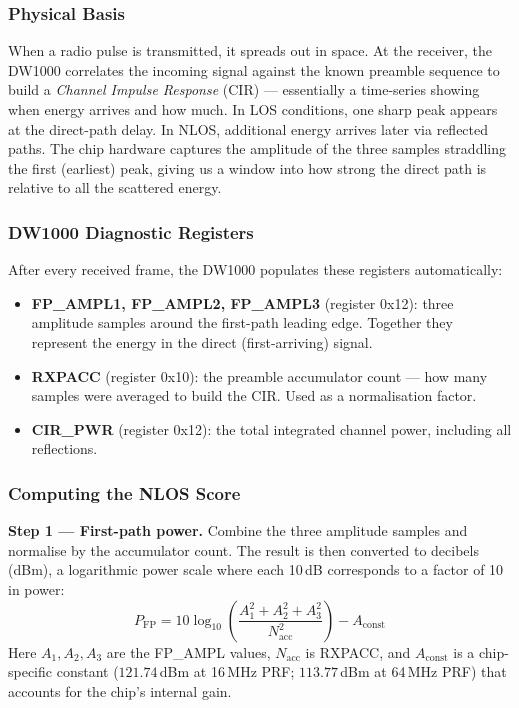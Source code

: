 \documentclass[11pt,a4paper]{article}
\begin{document}
\subsubsection{Physical Basis}

When a radio pulse is transmitted, it spreads out in space. At the receiver, the DW1000 correlates the incoming signal against the known preamble sequence to build a \emph{Channel Impulse Response} (CIR) --- essentially a time-series showing when energy arrives and how much. In LOS conditions, one sharp peak appears at the direct-path delay. In NLOS, additional energy arrives later via reflected paths. The chip hardware captures the amplitude of the three samples straddling the first (earliest) peak, giving us a window into how strong the direct path is relative to all the scattered energy.

\subsubsection{DW1000 Diagnostic Registers}

After every received frame, the DW1000 populates these registers automatically:

\begin{itemize}[leftmargin=2em]
  \item \textbf{FP\_AMPL1, FP\_AMPL2, FP\_AMPL3} (register 0x12): three amplitude samples around the first-path leading edge. Together they represent the energy in the direct (first-arriving) signal.
  \item \textbf{RXPACC} (register 0x10): the preamble accumulator count --- how many samples were averaged to build the CIR. Used as a normalisation factor.
  \item \textbf{CIR\_PWR} (register 0x12): the total integrated channel power, including all reflections.
\end{itemize}

\subsubsection{Computing the NLOS Score}

\textbf{Step 1 --- First-path power.} Combine the three amplitude samples and normalise by the accumulator count. The result is then converted to decibels (dBm), a logarithmic power scale where each 10\,dB corresponds to a factor of 10 in power:
\begin{equation}
P_\text{FP} = 10 \log_{10}\!\left(\frac{A_1^2 + A_2^2 + A_3^2}{N_\text{acc}^2}\right) - A_\text{const}
\label{eq:fppower}
\end{equation}
Here $A_1, A_2, A_3$ are the FP\_AMPL values, $N_\text{acc}$ is RXPACC, and $A_\text{const}$ is a chip-specific constant ($121.74$\,dBm at 16\,MHz PRF; $113.77$\,dBm at 64\,MHz PRF) that accounts for the chip's internal gain.
\end{document}
